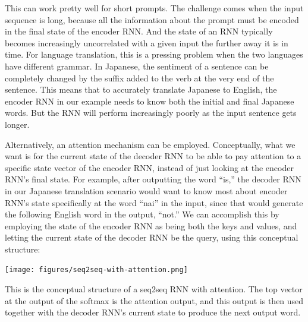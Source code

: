 %
%
%
%
This can work pretty well for short prompts.  The challenge comes when the input sequence is long, because all the information about the prompt must be encoded in the final state of the encoder RNN.  And the state of an RNN typically becomes increasingly uncorrelated with a given input the further away it is in time.  For language translation, this is a pressing problem when the two languages have different grammar.  In Japanese, the sentiment of a sentence can be completely changed by the suffix added to the verb at the very end of the sentence.  This means that to accurately translate Japanese to English, the encoder RNN in our example needs to know both the initial and final Japanese words.  But the RNN will perform increasingly poorly as the input sentence gets longer.

Alternatively, an attention mechanism can be employed.  Conceptually, what we want is for the current state of the decoder RNN to be able to pay attention to a specific state vector of the encoder RNN, instead of just looking at the encoder RNN's final state.  For example, after outputting the word ``is,'' the decoder RNN in our Japanese translation scenario would want to know most about encoder RNN's state specifically at the word ``nai'' in the input, since that would generate the following English word in the output, ``not.''  We can accomplish this by employing the state of the encoder RNN as being both the keys and values, and letting the current state of the decoder RNN be the query, using this conceptual structure:
\begin{center}
\texttt{[image: figures/seq2seq-with-attention.png]}
\end{center}
This is the conceptual structure of a seq2seq RNN with attention.  The top vector at the output of the softmax is the attention output, and this output is then used together with the decoder RNN's current state to produce the next output word.

